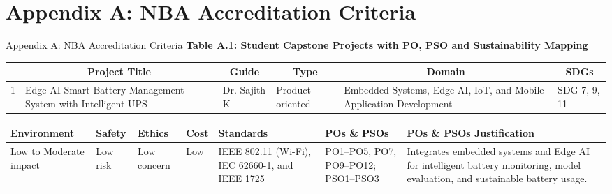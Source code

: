\documentclass[10pt,aspectratio=43]{beamer}
\begin{document}
\section{Appendix A: NBA Accreditation Criteria}

\begin{frame}{Appendix A: NBA Accreditation Criteria}
  \footnotesize
  \centering
  \renewcommand{\arraystretch}{1.15}
  \setlength{\tabcolsep}{2pt}
  \textbf{Table A.1: Student Capstone Projects with PO, PSO and Sustainability Mapping}\par
  \vspace{5pt}
  \begin{tabularx}{0.98\textwidth}{|p{}|p{}|p{}|p{}|X|p{}|}
    \hline
    \rowcolor{mappingheader}
    \multicolumn{1}{|c|}{\parbox{0.045\textwidth}{\centering\scriptsize\textbf{Sl. No.}}} &
    \multicolumn{1}{c|}{\parbox{0.22\textwidth}{\centering\textbf{Project Title}}} &
    \multicolumn{1}{c|}{\parbox{0.11\textwidth}{\centering\textbf{Guide}}} &
    \multicolumn{1}{c|}{\parbox{0.12\textwidth}{\centering\textbf{Type}}} &
    \multicolumn{1}{c|}{\parbox{0.30\textwidth}{\centering\textbf{Domain}}} &
    \multicolumn{1}{c|}{\parbox{0.10\textwidth}{\centering\textbf{SDGs}}} \\ \hline
    1 & Edge AI Smart Battery Management System with Intelligent UPS & Dr. Sajith K & Product-oriented & Embedded Systems, Edge AI, IoT, and Mobile Application Development & SDG 7, 9, 11 \\ \hline
  \end{tabularx}
  \par\vspace{8pt}
  \renewcommand{\arraystretch}{1.15}
  \setlength{\tabcolsep}{1.5pt}
 
  \vspace{3pt}
  \begin{tabularx}{0.98\textwidth}{|>{\centering\arraybackslash}p{}|>{\centering\arraybackslash}p{}|>{\centering\arraybackslash}p{}|>{\centering\arraybackslash}p{}|>{\centering\arraybackslash}p{}|>{\centering\arraybackslash}p{}|>{\raggedright\arraybackslash}X|}
    \hline
    \rowcolor{mappingheader}
    \textbf{Environment} & \textbf{Safety} & \textbf{Ethics} & \textbf{Cost} & \textbf{Standards} & \textbf{POs \& PSOs} & \textbf{POs \& PSOs Justification} \\ \hline
    Low to Moderate impact & Low risk & Low concern & Low & IEEE 802.11 (Wi-Fi), IEC 62660-1, and IEEE 1725 & PO1--PO5, PO7, PO9--PO12; PSO1--PSO3 & Integrates embedded systems and Edge AI for intelligent battery monitoring, model evaluation, and sustainable battery usage. \\ \hline
  \end{tabularx}
\end{frame}
\end{document}
